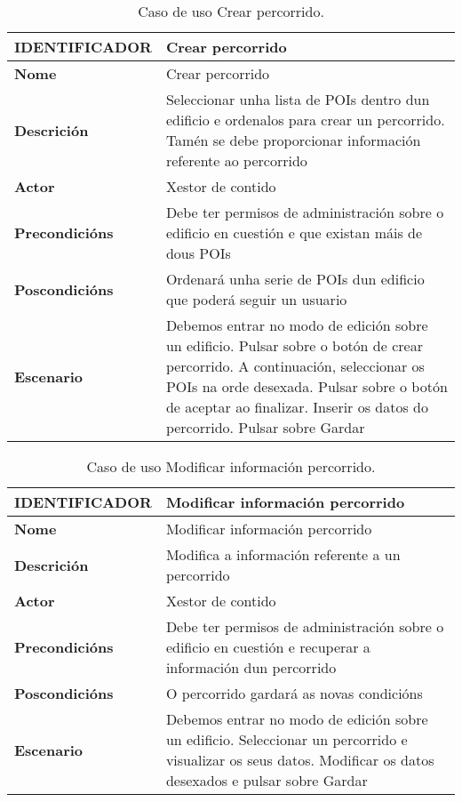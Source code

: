 \begin{table}[tbh]
	\footnotesize
	\centering
	\begin{tabular}{|l|p{10cm}|}
		\hline 
		\textbf{IDENTIFICADOR}	& \textbf{Crear percorrido} \\ 
		\hline 
		\textbf{Nome} & Crear percorrido \\ 
		\hline 
		\textbf{Descrición} & Seleccionar unha lista de POIs dentro dun edificio e ordenalos para crear un percorrido. Tamén se debe proporcionar información referente ao percorrido \\ 
		\hline 
		\textbf{Actor} & Xestor de contido \\ 
		\hline 
		\textbf{Precondicións} & Debe ter permisos de administración sobre o edificio en cuestión e que existan máis de dous POIs \\ 
		\hline 
		\textbf{Poscondicións} & Ordenará unha serie de POIs dun edificio que poderá seguir un usuario \\ 
		\hline 
		\textbf{Escenario} & Debemos entrar no modo de edición sobre un edificio. Pulsar sobre o botón de crear percorrido. A continuación, seleccionar os POIs na orde desexada. Pulsar sobre o botón de aceptar ao finalizar. Inserir os datos do percorrido. Pulsar sobre Gardar \\ 
		\hline 
	\end{tabular}
	\caption{Caso de uso Crear percorrido.}
	\label{tab:cuCrearPercorrido}
\end{table}

\begin{table}[tbh]
	\footnotesize
	\centering
	\begin{tabular}{|l|p{10cm}|}
		\hline 
		\textbf{IDENTIFICADOR}	& \textbf{Modificar información percorrido} \\ 
		\hline 
		\textbf{Nome} & Modificar información percorrido \\ 
		\hline 
		\textbf{Descrición} & Modifica a información referente a un percorrido \\ 
		\hline 
		\textbf{Actor} & Xestor de contido \\ 
		\hline 
		\textbf{Precondicións} & Debe ter permisos de administración sobre o edificio en cuestión e recuperar a información dun percorrido \\ 
		\hline 
		\textbf{Poscondicións} & O percorrido gardará as novas condicións \\ 
		\hline 
		\textbf{Escenario} & Debemos entrar no modo de edición sobre un edificio. Seleccionar un percorrido e visualizar os seus datos. Modificar os datos desexados e pulsar sobre Gardar \\ 
		\hline 
	\end{tabular}
	\caption{Caso de uso Modificar información percorrido.}
	\label{tab:cuModificarPercorrido}
\end{table}


